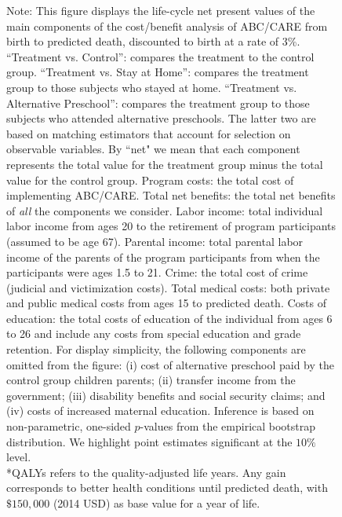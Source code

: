 \begin{figure}
{Note: This figure displays the life-cycle net present values of the main components of the cost/benefit analysis of ABC/CARE from birth to predicted death, discounted to birth at a rate of 3\%. ``Treatment vs. Control'': compares the treatment to the control group. ``Treatment vs. Stay at Home'': compares the treatment group to those subjects who stayed at home. ``Treatment vs. Alternative Preschool'': compares the treatment group to those subjects who attended alternative preschools. The latter two are based on matching estimators that account for selection on observable variables. By ``net" we mean that each component represents the total value for the treatment group minus the total value for the control group. Program costs: the total cost of implementing ABC/CARE. Total net benefits: the total net benefits of \textit{all} the components we consider. Labor income: total individual labor income from ages 20 to the retirement of program participants  (assumed to be age 67). Parental income: total parental labor income of the parents of the program participants from when the participants were ages 1.5 to 21. Crime: the total cost of crime (judicial and victimization costs). Total medical costs: both private and public medical costs from ages 15 to predicted death. Costs of education: the total costs of education of the individual from ages 6 to 26 and include any costs from special education and grade retention. For display simplicity, the following components are omitted from the figure: (i) cost of alternative preschool paid by the control group children parents; (ii) transfer income from the government; (iii) disability benefits and social security claims; and (iv) costs of increased maternal education. Inference is based on non-parametric, one-sided $p$-values from the empirical bootstrap distribution. We highlight point estimates significant at the $10\%$ level.\\
*QALYs refers to the quality-adjusted life years. Any gain corresponds to better health conditions until predicted death, with $\$150,000$ (2014 USD) as base value for a year of life.\\
}
\end{figure}

